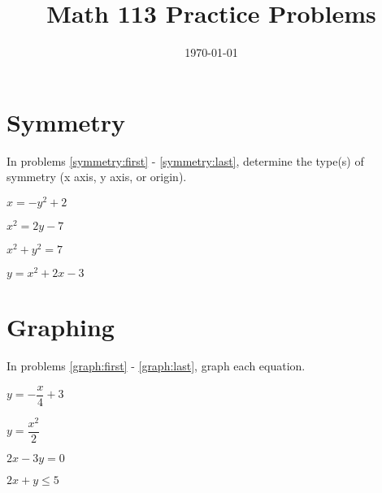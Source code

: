 \documentclass[fleqn,addpoints]{exam}
\title{Math 113 Practice Problems}
\author{}
\date{\today}
\begin{document}
\maketitle

\section{Symmetry}

In problems \ref{symmetry:first} - \ref{symmetry:last}, determine the type(s) of symmetry (x axis, y axis, or origin).

\begin{questions}

\question 
\( x = -y^2 + 2 \)
\label{symmetry:first}
\vspace{3 cm}

\question \( x^2 = 2y - 7 \)
\vspace{3 cm}

\question \( x^2 + y^2 = 7 \)
\vspace{3 cm}

\question \( y = x^2 + 2x - 3 \)
\label{symmetry:last}
\vspace{3 cm}

\pagebreak

\section{Graphing}
In problems \ref{graph:first} - \ref{graph:last}, graph each equation.

\question \( y = - \dfrac{x}{4} + 3 \)
\label{graph:first}
\vspace{4 cm}

\question \( y = \dfrac{x^2}{2} \)
\vspace{4 cm}

\question \( 2x - 3y = 0\)
\vspace{4 cm}

\question \( 2x + y \leq 5 \)
\label{graph:last}
\vspace{4 cm}

\end{questions}
\end{document}
